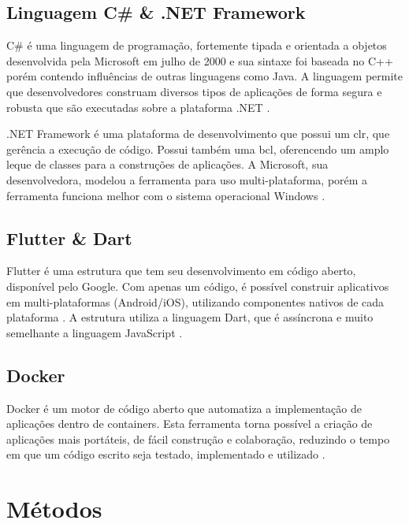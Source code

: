 \subsection{Linguagem C{\#} {\&} .NET Framework}\label{subsec:csharp}

C{\#} é uma linguagem de programação, fortemente tipada e orientada a objetos desenvolvida pela Microsoft em julho de 2000 e sua sintaxe foi baseada no C++ porém contendo influências de outras linguagens como Java. A linguagem permite que desenvolvedores construam diversos tipos de aplicações de forma segura e robusta que são executadas sobre a plataforma .NET \cite{CSharp}.

.NET Framework é uma plataforma de desenvolvimento que possui um \gls{clr}, que gerência a execução de código. Possui também uma \gls{bcl}, oferencendo um amplo leque de classes para a construções de aplicações. A Microsoft, sua desenvolvedora, modelou a ferramenta para uso multi-plataforma, porém a ferramenta funciona melhor com o sistema operacional Windows \cite{CSharpDevelopment}.

\subsection{Flutter {\&} Dart}\label{subsec:flutterdart}

Flutter é uma estrutura que tem seu desenvolvimento em código aberto, disponível pelo Google. Com apenas um código, é possível construir aplicativos em multi-plataformas (Android/iOS), utilizando componentes nativos de cada plataforma \cite{Flutter}. A estrutura utiliza a linguagem Dart, que é assíncrona e muito semelhante a linguagem JavaScript \cite{Dart}.

\subsection{Docker}\label{subsec:docker}

Docker é um motor de código aberto que automatiza a implementação de aplicações dentro de containers. Esta ferramenta torna possível a criação de aplicações mais portáteis, de fácil construção e colaboração, reduzindo o tempo em que um código escrito seja testado, implementado e utilizado \cite{TheDockerBook}.

\section{Métodos}\label{sec:metodo}

